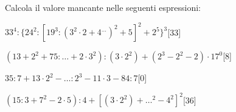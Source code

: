 % 
% 

Calcola il valore mancante nelle seguenti espressioni:

\begin{esercizio} %
\(33^4:\{24^2:[19^3:(3^2\cdot2+4^{\dots})^2+5]^2+2^{5}\}^3\)\hfill[33]
\end{esercizio}
\begin{esercizio} %
\((13+2^2+75:{\dots}+2\cdot3^2):(3\cdot2^2)+(2^3-2^2-2)\cdot17^0\)\hfill[8]
\end{esercizio}
\begin{esercizio} %
\(35:7+13\cdot2^2-{\dots}:2^3-11\cdot3-84:7\)\hfill[0]
\end{esercizio}
\begin{esercizio} %
\((15:3+7^2-2\cdot5):4+[(3\cdot2^2)+{\dots}^2-4^2]^2\)\hfill[36]
\end{esercizio}
